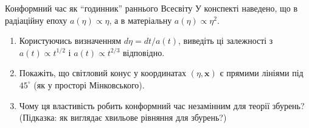 \begin{problem}{Конформний час як ``годинник'' раннього Всесвіту}
У конспекті наведено, що в радіаційну епоху \(a(\eta) \propto \eta\),
а в матеріальну \(a(\eta) \propto \eta^2\).

\begin{enumerate}
    \item Користуючись визначенням \(d\eta = dt/a(t)\),
          виведіть ці залежності з \(a(t) \propto t^{1/2}\) і
          \(a(t) \propto t^{2/3}\) відповідно.
    \item Покажіть, що світловий конус у координатах \((\eta, \mathbf{x})\)
          є прямими лініями під \(45^\circ\) (як у просторі Мінковського).
    \item Чому ця властивість робить конформний час незамінним для
          теорії збурень?
          (Підказка: як виглядає хвильове рівняння для збурень?)
\end{enumerate}
\end{problem}

